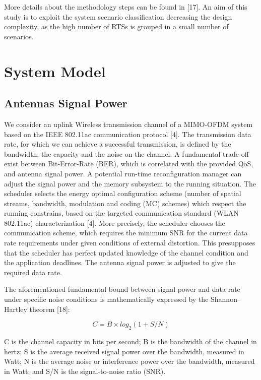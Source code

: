 	More details about the methodology steps can be found in [17]. An aim of this study is to exploit the system scenario classification decreasing the design complexity, as the high number of RTSs is grouped in a small number of scenarios. 

\section{System Model}

\subsection{Antennas Signal Power }

We consider an uplink Wireless transmission channel of a MIMO-OFDM system based on the IEEE 802.11ac communication protocol [4]. The transmission data rate, for which we can achieve a successful transmission, is defined by the bandwidth, the capacity and the noise on the channel. A fundamental trade-off exist between Bit-Error-Rate (BER), which is correlated with the provided QoS, and antenna signal power. A potential run-time reconfiguration manager can adjust the signal power and the memory subsystem to the running situation. The scheduler selects the energy optimal configuration scheme (number of spatial streams, bandwidth, modulation and coding (MC) schemes) which respect the running constrains, based on the targeted communication standard (WLAN 802.11ac) characterization [4]. More precisely, the scheduler chooses the communication scheme, which requires the minimum SNR for the current data rate requirements under given conditions of external distortion. This presupposes that the scheduler has perfect updated knowledge of the channel condition and the application deadlines. The antenna signal power is adjusted to give the required data rate. 

	The aforementioned fundamental bound between signal power and data rate under specific noise conditions is mathematically expressed by the Shannon–Hartley theorem [18]:

\begin{equation}
C = B \times log_{2}(1+ S/N)
\end{equation}

C is the channel capacity in bits per second; B is the bandwidth of the channel in hertz; S is the average received signal power over the bandwidth, measured in Watt; N is the average noise or interference power over the bandwidth, measured in Watt; and S/N is the signal-to-noise ratio (SNR). 

